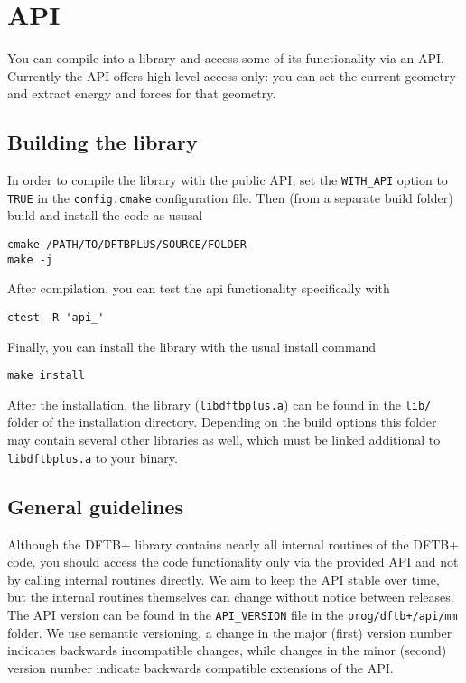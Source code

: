 \chapter{\dftbp{} API}

You can compile \dftbp{} into a library and access some of its functionality via
an API. Currently the API offers high level access only: you can set the current
geometry and extract energy and forces for that geometry.

\section{Building the library}

In order to compile the \dftbp{} library with the public API, set the
\verb|WITH_API| option to \verb|TRUE| in the \verb|config.cmake| configuration
file. Then (from a separate build folder) build and install the code as ususal
\begin{verbatim}
cmake /PATH/TO/DFTBPLUS/SOURCE/FOLDER
make -j
\end{verbatim}

After compilation, you can test the api functionality specifically with
\begin{verbatim}
ctest -R 'api_'
\end{verbatim}

Finally, you can install the library with the usual install command
\begin{verbatim}
make install
\end{verbatim}

After the installation, the library (\verb|libdftbplus.a|) can be found in the
\verb|lib/| folder of the installation directory. Depending on the build options
this folder may contain several other libraries as well, which must be linked
additional to \verb|libdftbplus.a| to your binary.

\section{General guidelines}

Although the DFTB+ library contains nearly all internal routines of the DFTB+
code, you should access the code functionality only via the provided API and not
by calling internal routines directly. We aim to keep the API stable over time,
but the internal routines themselves can change without notice between
releases. The API version can be found in the \verb|API_VERSION| file in the
\verb|prog/dftb+/api/mm| folder. We use semantic versioning, a change in the
major (first) version number indicates backwards incompatible changes, while
changes in the minor (second) version number indicate backwards compatible
extensions of the API.

